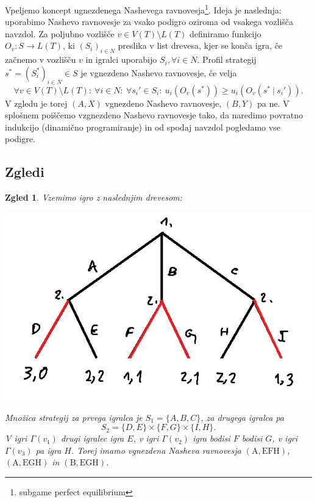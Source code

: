 \documentclass[10pt, a4paper]{article}
\newtheorem{zgled}[izr]{Zgled}
\begin{document}
Vpeljemo koncept ugnezdenega Nashevega ravnovesja\footnote{subgame perfect equilibrium}.
Ideja je naslednja: uporabimo Nashevo ravnovesje za vsako podigro oziroma od vsakega vozlišča navzdol.
Za poljubno vozlišče $v \in V(T) \setminus L(T)$ definiramo funkcijo $O_v: S \to L(T)$,
ki $(S_i)_{i \in N}$ preslika v list drevesa, kjer se konča igra, če začnemo v vozlišču $v$ in igralci 
uporabijo $S_i, \forall i \in N$. Profil strategij $s^* = (S_i^*)_{i \in N} \in S$ 
je vgnezdeno Nashevo ravnovesje, če velja 
$$\forall v \in V(T) \setminus L(T):\ \forall i \in N:\ \forall s{_i}' \in S_i:\ u_i (O_v(s^*)) \geq u_i (O_v(s^*\ |\ s{_i}' )).$$
V zgledu je torej $(A, X)$ vgnezdeno Nashevo ravnovesje, $(B, Y)$ pa ne. V splošnem poiščemo vzgnezdeno Nashevo 
ravnovesje tako, da naredimo povratno indukcijo (dinamično programiranje) in od spodaj navzdol pogledamo vse podigre.

\subsection{Zgledi}

\begin{zgled}
  Vzemimo igro z naslednjim drevesom:
  \begin{center}
    \includegraphics[scale=0.7]{drevo_5.png}
  \end{center}
  Množica strategij za prvega igralca je $S_1 = \{A, B, C\}$, za drugega igralca pa 
  $$S_2 = \{D, E\} \times \{F, G\} \times \{I, H\}.$$
  V igri $\Gamma(v_1)$ drugi igralec igra $E$, v igri $\Gamma(v_2)$ igra bodisi $F$ bodisi $G$,
  v igri $\Gamma(v_3)$ pa igra $H$. Torej imamo vgnezdena Nasheva ravnovesja $(\text{A}, \text{EFH})$, $(\text{A}, \text{EGH})$ in $(\text{B}, \text{EGH})$.
\end{zgled}
\end{document}
